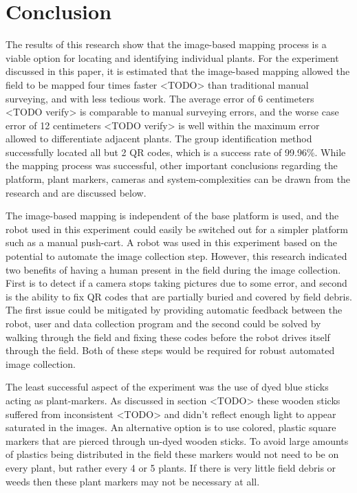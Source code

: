 
\cleardoublepage

\chapter{Conclusion}
\label{chapter:conclusion}

The results of this research show that the image-based mapping process is a viable option for locating and identifying individual plants.  For the experiment discussed in this paper, it is estimated that the image-based mapping allowed the field to be mapped four times faster <TODO> than traditional manual surveying, and with less tedious work.  The average error of 6 centimeters <TODO verify> is comparable to manual surveying errors, and the worse case error of 12 centimeters <TODO verify> is well within the maximum error allowed to differentiate adjacent plants.  The group identification method successfully located all but 2 QR codes, which is a success rate of 99.96\%.  While the mapping process was successful, other important conclusions regarding the platform, plant markers, cameras and system-complexities can be drawn from the research and are discussed below.

The image-based mapping is independent of the base platform is used, and the robot used in this experiment could easily be switched out for a simpler platform such as a manual push-cart.  A robot was used in this experiment based on the potential to automate the image collection step.  However, this research indicated two benefits of having a human present in the field during the image collection.  First is to detect if a camera stops taking pictures due to some error, and second is the ability to fix QR codes that are partially buried and covered by field debris.  The first issue could be mitigated by providing automatic feedback between the robot, user and data collection program and the second could be solved by walking through the field and fixing these codes before the robot drives itself through the field.  Both of these steps would be required for robust automated image collection.       

The least successful aspect of the experiment was the use of dyed blue sticks acting as plant-markers.  As discussed in section <TODO> these wooden sticks suffered from inconsistent <TODO> and didn't reflect enough light to appear saturated in the images.  An alternative option is to use colored, plastic square markers that are pierced through un-dyed wooden sticks.  To avoid large amounts of plastics being distributed in the field these markers would not need to be on every plant, but rather every 4 or 5 plants.  If there is very little field debris or weeds then these plant markers may not be necessary at all. 

